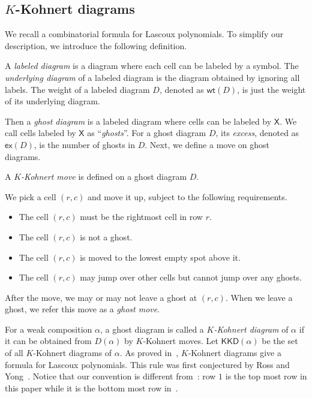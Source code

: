 \documentclass[ALCO]{cedram}
\newcommand{\KKD}{\mathsf{KKD}}
\newcommand{\X}{\mathsf{X}}
\newcommand{\wt}{\mathsf{wt}}
\newcommand{\ex}{\mathsf{ex}}
\newcommand{\definition}[1]{{\color{darkred}\emph{#1}}}
\begin{document}
\subsection{\texorpdfstring{$K$}{TEXT}-Kohnert diagrams}
We recall a combinatorial formula for Lascoux polynomials. 
To simplify our description, 
we introduce the following definition.
\begin{defn}
A \definition{labeled diagram} 
is a diagram where each cell can be labeled 
by a symbol.
The \definition{underlying diagram} of a labeled diagram
is the diagram obtained by ignoring all labels. 
The weight of a labeled diagram $D$, denoted as $\wt(D)$,
is just the weight of its underlying diagram.
\end{defn}

Then a \definition{ghost diagram} is a labeled diagram 
where cells can be labeled by $\X$.
We call cells labeled by $\X$ as ``\definition{ghosts}''. 
For a ghost diagram $D$, its \definition{excess}, denoted as $\ex(D)$,
is the number of ghosts in $D$.
Next, we define a move on ghost diagrams.

\begin{defn}
A \definition{$K$-Kohnert move} is defined on a ghost diagram $D$. 

We pick a cell $(r,c)$ and move it up, 
subject to the following requirements.
\begin{itemize}
\item The cell $(r,c)$ must be the rightmost cell in row $r$.
\item The cell $(r,c)$ is not a ghost.
\item The cell $(r,c)$ is moved to the lowest empty spot above it.
\item The cell $(r,c)$ may jump over other cells but cannot jump over any ghosts.
\end{itemize}
After the move, 
we may or may not leave a ghost at $(r,c)$. 
When we leave a ghost, 
we refer this move as a \definition{ghost move}.
\end{defn}

For a weak composition $\alpha$,
a ghost diagram is called a \definition{$K$-Kohnert diagram}
of $\alpha$ if it can be obtained from $D(\alpha)$
by $K$-Kohnert moves. 
Let $\KKD(\alpha)$ be the set of all $K$-Kohnert diagrams
of $\alpha$.
As proved in~\cite{PY}, 
$K$-Kohnert diagrams give a formula for Lascoux polynomials. 
This rule was first conjectured by Ross and Yong~\cite{RossY}.
Notice that our convention is different from~\cite{PY}:
row $1$ is the top most row in this paper while it is the 
bottom most row in~\cite{PY}. 
\end{document}
